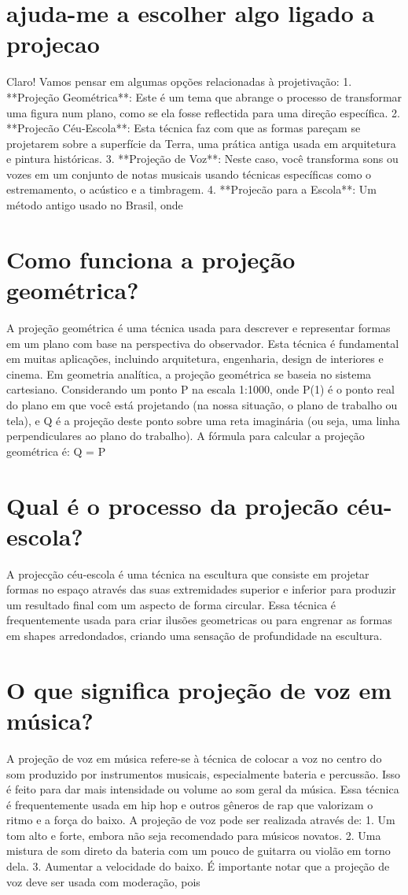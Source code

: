 \documentclass[11pt,a4paper]{article}
\begin{document}
\section{ajuda-me a escolher algo ligado a projecao}
Claro! Vamos pensar em algumas opções relacionadas à projetivação: 1. **Projeção Geométrica**: Este é um tema que abrange o processo de transformar uma figura num plano, como se ela fosse reflectida para uma direção específica. 2. **Projecão Céu-Escola**: Esta técnica faz com que as formas pareçam se projetarem sobre a superfície da Terra, uma prática antiga usada em arquitetura e pintura históricas. 3. **Projeção de Voz**: Neste caso, você transforma sons ou vozes em um conjunto de notas musicais usando técnicas específicas como o estremamento, o acústico e a timbragem. 4. **Projecão para a Escola**: Um método antigo usado no Brasil, onde

\section{Como funciona a projeção geométrica?}
A projeção geométrica é uma técnica usada para descrever e representar formas em um plano com base na perspectiva do observador. Esta técnica é fundamental em muitas aplicações, incluindo arquitetura, engenharia, design de interiores e cinema. Em geometria analítica, a projeção geométrica se baseia no sistema cartesiano. Considerando um ponto P na escala 1:1000, onde P(1) é o ponto real do plano em que você está projetando (na nossa situação, o plano de trabalho ou tela), e Q é a projeção deste ponto sobre uma reta imaginária (ou seja, uma linha perpendiculares ao plano do trabalho). A fórmula para calcular a projeção geométrica é: Q = P

\section{Qual é o processo da projecão céu-escola?}
A projecção céu-escola é uma técnica na escultura que consiste em projetar formas no espaço através das suas extremidades superior e inferior para produzir um resultado final com um aspecto de forma circular. Essa técnica é frequentemente usada para criar ilusões geometricas ou para engrenar as formas em shapes arredondados, criando uma sensação de profundidade na escultura.

\section{O que significa projeção de voz em música?}
A projeção de voz em música refere-se à técnica de colocar a voz no centro do som produzido por instrumentos musicais, especialmente bateria e percussão. Isso é feito para dar mais intensidade ou volume ao som geral da música. Essa técnica é frequentemente usada em hip hop e outros gêneros de rap que valorizam o ritmo e a força do baixo. A projeção de voz pode ser realizada através de: 1. Um tom alto e forte, embora não seja recomendado para músicos novatos. 2. Uma mistura de som direto da bateria com um pouco de guitarra ou violão em torno dela. 3. Aumentar a velocidade do baixo. É importante notar que a projeção de voz deve ser usada com moderação, pois
\end{document}
